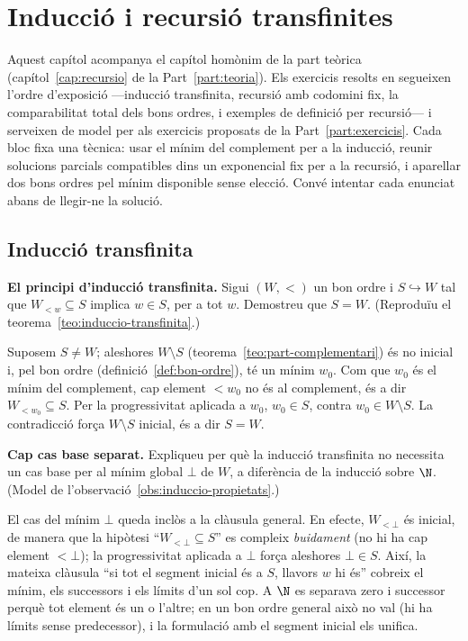 \chapter{Inducció i recursió transfinites}\label{cap:practica-recursio}

Aquest capítol acompanya el capítol homònim de la part teòrica (capítol~\ref{cap:recursio} de la Part~\ref{part:teoria}). Els exercicis resolts en segueixen l'ordre d'exposició ---inducció transfinita, recursió amb codomini fix, la comparabilitat total dels bons ordres, i exemples de definició per recursió--- i serveixen de model per als exercicis proposats de la Part~\ref{part:exercicis}. Cada bloc fixa una tècnica: usar el mínim del complement per a la inducció, reunir solucions parcials compatibles dins un exponencial fix per a la recursió, i aparellar dos bons ordres pel mínim disponible sense elecció. Convé intentar cada enunciat abans de llegir-ne la solució.

\section{Inducció transfinita}\label{prac:induccio-transfinita}

\begin{exercici}
\textbf{El principi d'inducció transfinita.} Sigui \((W,<)\) un bon ordre i \(S\hookrightarrow W\) tal que \(W_{<w}\subseteq S\) implica \(w\in S\), per a tot \(w\). Demostreu que \(S=W\). (Reproduïu el teorema~\ref{teo:induccio-transfinita}.)
\end{exercici}
\begin{solucio}
Suposem \(S\ne W\); aleshores \(W\setminus S\) (teorema~\ref{teo:part-complementari}) és no inicial i, pel bon ordre (definició~\ref{def:bon-ordre}), té un mínim \(w_0\). Com que \(w_0\) és el mínim del complement, cap element \(<w_0\) no és al complement, és a dir \(W_{<w_0}\subseteq S\). Per la progressivitat aplicada a \(w_0\), \(w_0\in S\), contra \(w_0\in W\setminus S\). La contradicció força \(W\setminus S\) inicial, és a dir \(S=W\).
\end{solucio}

\begin{exercici}
\textbf{Cap cas base separat.} Expliqueu per què la inducció transfinita no necessita un cas base per al mínim global \(\bot\) de \(W\), a diferència de la inducció sobre \(\N\). (Model de l'observació~\ref{obs:induccio-propietats}.)
\end{exercici}
\begin{solucio}
El cas del mínim \(\bot\) queda inclòs a la clàusula general. En efecte, \(W_{<\bot}\) és inicial, de manera que la hipòtesi \enquote{\(W_{<\bot}\subseteq S\)} es compleix \emph{buidament} (no hi ha cap element \(<\bot\)); la progressivitat aplicada a \(\bot\) força aleshores \(\bot\in S\). Així, la mateixa clàusula \enquote{si tot el segment inicial és a \(S\), llavors \(w\) hi és} cobreix el mínim, els successors i els límits d'un sol cop. A \(\N\) es separava zero i successor perquè tot element és un o l'altre; en un bon ordre general això no val (hi ha límits sense predecessor), i la formulació amb el segment inicial els unifica.
\end{solucio}

